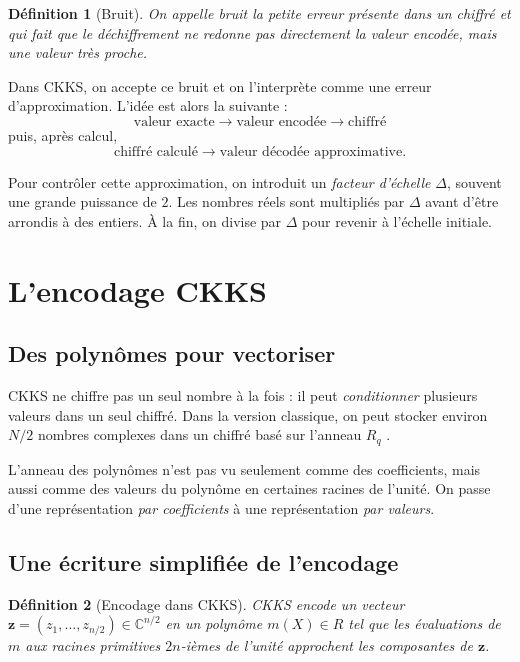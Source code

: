 \documentclass[11pt,a4paper]{article}
\newcommand{\C}{\mathbb{C}}
\newtheorem{definition}{Définition}[section]
\begin{document}
\begin{definition}[Bruit]
On appelle \emph{bruit} la petite erreur présente dans un chiffré et qui fait que le déchiffrement ne redonne pas directement la valeur encodée, mais une valeur très proche.
\end{definition}

Dans CKKS, on accepte ce bruit et on l'interprète comme une erreur d'approximation. L'idée est alors la suivante :
\[
\text{valeur exacte} \longrightarrow \text{valeur encodée} \longrightarrow \text{chiffré}
\]
puis, après calcul,
\[
\text{chiffré calculé} \longrightarrow \text{valeur décodée approximative}.
\]

Pour contrôler cette approximation, on introduit un \emph{facteur d'échelle} $\Delta$, souvent une grande puissance de $2$. Les nombres réels sont multipliés par $\Delta$ avant d'être arrondis à des entiers. À la fin, on divise par $\Delta$ pour revenir à l'échelle initiale.

\section{L'encodage CKKS}

\subsection{Des polynômes pour vectoriser}

CKKS ne chiffre pas un seul nombre à la fois : il peut \emph{conditionner} plusieurs valeurs dans un seul chiffré. Dans la version classique, on peut stocker environ $N/2$ nombres complexes dans un chiffré basé sur l'anneau $R_q$ .

L'anneau des polynômes n'est pas vu seulement comme des coefficients, mais aussi comme des valeurs du polynôme en certaines racines de l'unité. On passe d'une représentation \emph{par coefficients} à une représentation \emph{par valeurs}.



\subsection{Une écriture simplifiée de l'encodage}

\begin{definition}[Encodage dans CKKS]
CKKS encode un vecteur $\mathbf{z} = (z_1, \ldots, z_{n/2}) \in \C^{n/2}$
en un polynôme $m(X) \in R$ tel que les évaluations de $m$ aux racines
primitives $2n$-ièmes de l'unité approchent les composantes de $\mathbf{z}$.
\end{definition}
\end{document}
